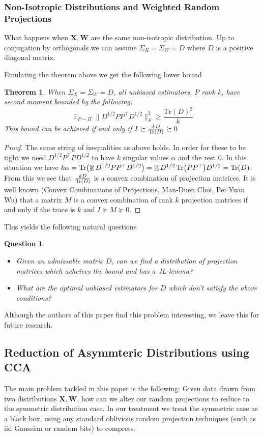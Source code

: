 \documentclass{article}
\newtheorem{theorem}{Theorem}[section]
\newtheorem*{question*}{Question}
\theoremstyle{definition}
\theoremstyle{plain}
\DeclareMathOperator{\E}{\mathbb{E}}
\DeclarePairedDelimiter\parentheses{\lparen}{\rparen}
\newcommand{\Tr}[1]{\operatorname{Tr} \parentheses*{#1}}
\begin{document}
\subsubsection*{Non-Isotropic Distributions and Weighted Random Projections} \label{sec:symmetric}
What happens when $\mathbf{X}, \mathbf{W}$ are the same non-isotropic distribution. Up to conjugation by orthogonals we can assume $\Sigma_X = \Sigma_W = D$ where $D$ is a positive diagonal matrix. 

Emulating the theorem above we get the following lower bound
\begin{theorem} \label{thm:weighted}
When $\Sigma_X = \Sigma_W = D$, all unbiased estimators, $P$ rank $k$, have second moment bounded by the following:
\[\E_{P\sim \Pi} \| D^{1/2} P P^\top D^{1/2} \|_F^2 \geq \frac{\text{Tr}(D)^2}{k}\]
This bound can be achieved if and only if $I \succeq \frac{k D}{\Tr{D}} \succeq 0$
\end{theorem}
\begin{proof}
The same string of inequalities as above holds. In order for these to be tight we need $D^{1/2} P^\top P D^{1/2}$ to have $k$ singular values $\alpha$ and the rest $0$. 
In this situation we have $k \alpha =  \Tr{\E D^{1/2} P P^\top D^{1/2}} = \E D^{1/2} \Tr{P P^\top} D^{1/2} = \Tr{D}$. From this we see that $\frac{k D}{\Tr{D}}$ is a convex combination of projection matrices. It is well known (Convex Combinations of Projections, Man-Duen Choi, Pei Yuan Wu) that a matrix $M$ is a convex combination of rank $k$ projection matrices if and only if the trace is $k$ and $I \succeq M \succeq 0$.
\end{proof}

This yields the following natural questions
\begin{question*}~
\begin{itemize}\label{ques:symmetric}
    \item Given an admissable matrix $D$, can we find a distribution of projection matrices which acheives the bound and has a JL-lemma?
    \item What are the optimal unbiased estimators for $D$ which don't satisfy the above conditions?
\end{itemize}
\end{question*}
Although the authors of this paper find this problem interesting, we leave this for future research.

\subsection{Reduction of Asymmteric Distributions using CCA}
The main problem tackled in this paper is the following: Given data drawn from two distributions $\mathbf{X}, \mathbf{W}$, how can we alter our random projections to reduce to the symmetric distribution case. In our treatment we treat the symmetric case as a black box, using any standard oblivious random projection techniques (such as iid Gaussian or random bits) to compress.
\end{document}
